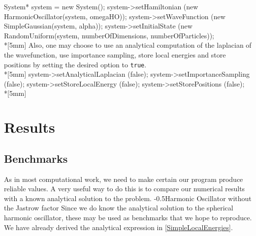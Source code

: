 \documentclass[english, a4paper]{article}
\makeatletter
\renewcommand{\subsubsection}{\@startsection{subsubsection}{3}{0pt}%
{-\baselineskip}{0.5\baselineskip}{\bf\large}}
\makeatother
\begin{document}
System* system = new System();
system->setHamiltonian                  (new HarmonicOscillator(system, omegaHO));
system->setWaveFunction                 (new SimpleGaussian(system, alpha));
system->setInitialState                 (new RandomUniform(system, numberOfDimensions, numberOfParticles));
\\*[5mm]
Also, one may choose to use an analytical computation of the laplacian of the wavefunction, use importance sampling, store local energies and store positions by setting the desired option to \texttt{true}.\\*[5mm]
system->setAnalyticalLaplacian          (false);
system->setImportanceSampling           (false);
system->setStoreLocalEnergy             (false);
system->setStorePositions               (false);
\\*[5mm]

\section{Results}


\subsection{Benchmarks}
As in most computational work, we need to make certain our program produce reliable values. 
A very useful way to do this is to compare our numerical results with a known analytical solution to the problem. 
\subsubsection{Harmonic Oscillator without the Jastrow factor}
Since we do know the analytical solution to the spherical harmonic oscillator, these may be used as benchmarks that we hope to reproduce.
We have already derived the analytical expression in \eqref{SimpleLocalEnergies}. 
\end{document}
